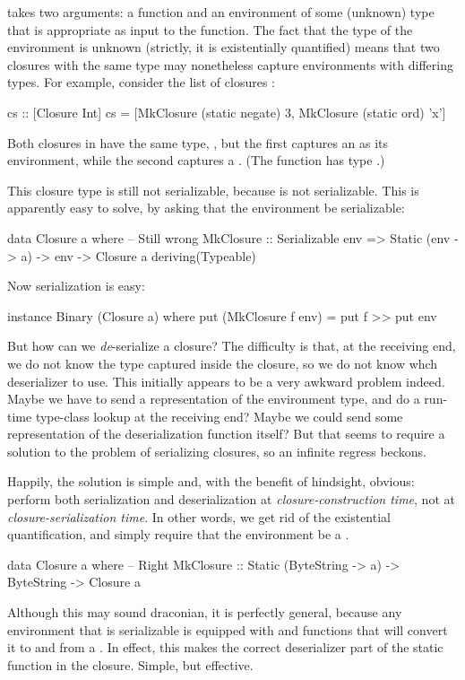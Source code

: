 \documentclass[preprint]{sigplanconf}
\begin{document}
 takes two arguments: a  function and an environment of some (unknown) type  that is appropriate as input to the function.
The fact that the type of the environment is unknown (strictly, it is existentially quantified) means 
that two closures with the same type may nonetheless capture environments
with differing types.  For example, consider the list of closures :
\begin{code}
  cs :: [Closure Int]
  cs = [MkClosure (static negate) 3,
        MkClosure (static ord)   'x']
\end{code}
Both closures in  have the same type, ,
but the first captures an  as its environment, while the second
captures a \mbox{.}  
(The function  has type .)

This closure type is still not serializable, because  is not serializable.
This is apparently easy to solve, by asking
that the environment be serializable:
\begin{code}
data Closure a where   -- Still wrong
  MkClosure :: Serializable env =>
        			Static (env -> a) -> env -> Closure a
  deriving(Typeable)
\end{code}
Now serialization is easy:
\begin{code}
instance Binary (Closure a) where
   put (MkClosure f env) = put f >> put env
\end{code}
But how can we \emph{de}-serialize a closure?  The difficulty is
that, at the receiving end, we do not know the type captured inside
the closure, so we do not know whch deserializer to use.  This initially
appears to be a very awkward problem indeed. Maybe we have to send a 
representation of the environment type, and do a run-time type-class lookup
at the receiving end?  Maybe
we could send some representation of the deserialization function itself?
But that seems to require a solution to the problem of serializing 
closures, so an infinite regress beckons.

Happily, the solution is simple and, with the benefit of hindsight,
obvious: perform both serialization and deserialization at \emph{closure-construction time},
not at \emph{closure-serialization time}.  
In other words, we get rid of the existential quantification, and simply require that the environment be a .  

\begin{code}
data Closure a where   -- Right
  MkClosure :: Static (ByteString -> a) ->
									ByteString -> Closure a
\end{code}
Although this may sound draconian, it is perfectly general, because any environment  that is serializable is equipped with  and  functions that will convert it to and from a . 
In effect, this makes the  correct deserializer part of the static function in the closure.  Simple, but effective.
\end{document}
